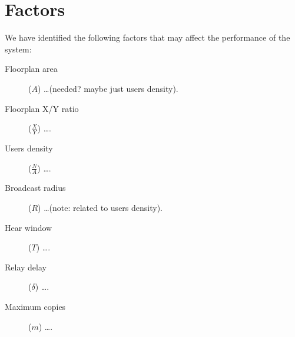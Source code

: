 \section{Factors}\label{sec:factors}

We have identified the following factors that may affect the performance of the
system:
\begin{description}
	\item[Floorplan area] (\(A\)) \ldots (needed? maybe just users density).
	\item[Floorplan X/Y ratio] (\(\frac{X}{Y}\)) \ldots.
	\item[Users density] (\(\frac{N}{A}\)) \ldots.
	\item[Broadcast radius] (\(R\)) \ldots (note: related to users density).
	\item[Hear window] (\(T\)) \ldots.
	\item[Relay delay] (\(\delta\)) \ldots.
	\item[Maximum copies] (\(m\)) \ldots.
\end{description}
